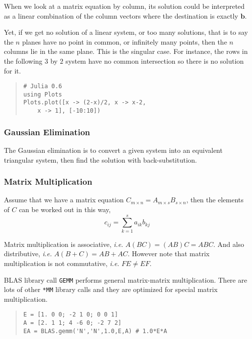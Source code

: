 When we look at a matrix equation by column, its solution could be
interpreted as a linear combination of the column vectors
where the destination is exactly $\mathbf{b}$.

Yet, if we get no solution of a linear system, or too many solutions,
that is to say the $n$ planes have no point in common, or infinitely
many points, then the $n$ columns lie in the same plane. This is the
singular case. For instance, the rows in the following $3$ by $2$
system have no common intersection so there is no solution for it.

\begin{quote}\begin{lstlisting}
# Julia 0.6
using Plots
Plots.plot([x -> (2-x)/2, x -> x-2,
	x -> 1], [-10:10])
\end{lstlisting}\end{quote}

 \subsubsection{Gaussian Elimination}
 The Gaussian elimination is to convert a given system into an
 equivalent triangular system, then find the solution with
 back-substitution.

 \subsubsection{Matrix Multiplication}
 Assume that we have a matrix equation
 $C_{m\times n} = A_{m\times s} B_{s\times n}$, then the elements of $C$
 can be worked out in this way, $$ c_{ij} = \sum_{k=1}^s a_{ik}b_{kj} $$

 Matrix multiplication is associative, {\it i.e.} $A(BC)=(AB)C=ABC$.
 And also distributive, {\it i.e.} $A(B+C)=AB+AC$. However note that
 matrix multiplication is not commutative, {\it i.e.} $FE\neq EF$.

 BLAS library call \verb|GEMM| performs general matrix-matrix multiplication.
 There are lots of other \verb|*MM| library calls and they are optimized for
 special matrix multiplication.

\begin{quote}\begin{lstlisting}
E = [1. 0 0; -2 1 0; 0 0 1]
A = [2. 1 1; 4 -6 0; -2 7 2]
EA = BLAS.gemm('N','N',1.0,E,A) # 1.0*E*A
\end{lstlisting}\end{quote}

